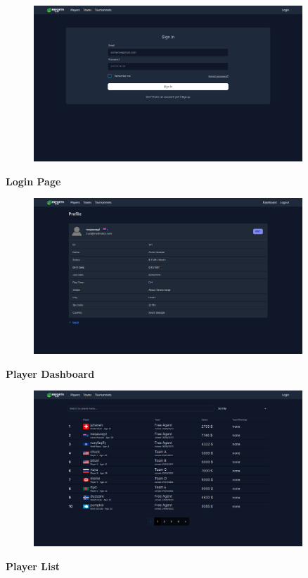 \begin{center}
    \begin{figure}[H]
        \centering
        \includegraphics[width=0.9\textwidth]{Chapter 3/UI/login-page.png}
        \label{fig:Login Page}
    \end{figure}
    \textbf{Login Page}

    \clearpage
    \begin{figure}[H]
        \centering
        \includegraphics[width=0.9\textwidth]{Chapter 3/UI/dashboard.png}
        \label{fig:dashboard}
    \end{figure}
    \textbf{Player Dashboard}


    \begin{figure}[H]
        \centering
        \includegraphics[width=0.9\textwidth]{Chapter 3/UI/player-list.png}
        \label{fig:player-list}
    \end{figure}
    \textbf{Player List}

\end{center}